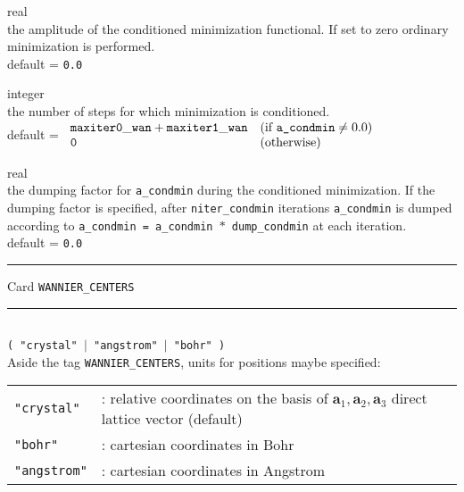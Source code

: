 {\noindent{}%
{\sc real} \\ the amplitude of the conditioned minimization functional. If set to zero
              ordinary minimization is performed.\\ 
{\sc default} = {\tt 0.0} \par

\noindent{}%
{\sc integer} \\ the number of steps for which minimization is conditioned.\\
{\sc default} = $\begin{array}{ll}
           {\tt maxiter0\_wan + maxiter1\_wan}     & \textrm{(if {\tt a\_condmin}} \neq 0.0)\\
           {\tt 0}                                 & \textrm{(otherwise)}
           \end{array}$ \par

\noindent{}%
{\sc real} \\ the dumping factor for {\tt a\_condmin} during the conditioned minimization.
              If the dumping factor is specified, after {\tt niter\_condmin} 
              iterations {\tt a\_condmin}
              is dumped according to {\tt a\_condmin = a\_condmin $*$ dump\_condmin}
              at each iteration.\\
{\sc default} = {\tt 0.0} \par
}
\bigskip

\begin{centering}
\rule{2.0in}{0.01in} Card {\tt WANNIER\_CENTERS} \rule{2.0in}{0.01in}
\end{centering}\\

{\tt ( "crystal" $\mid$ "angstrom" $\mid$ "bohr" ) }\\

\noindent Aside the tag {\tt WANNIER\_CENTERS}, units for positions maybe specified:\\
%
%
\begin{tabular}{ll}
\texttt{"crystal"}  & : relative coordinates on the basis of $\mathbf{a}_1,\mathbf{a}_2,\mathbf{a}_3$
                                direct lattice vector (default)\\
\texttt{"bohr"}     & : cartesian coordinates in Bohr\\
\texttt{"angstrom"} & : cartesian coordinates in Angstrom
\end{tabular}
%
%
\\

